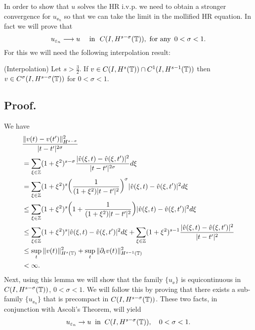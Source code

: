 		In order to show that  $u$ solves the HR i.v.p. we need to 
		obtain a stronger  convergence for  $u_{\ee_n}$ so that 
		we can take the limit in the mollified HR equation.
		In fact we will prove that 
		\begin{equation}
			\label{strong-conv}
			u_{\varepsilon_n}\longrightarrow u
			\quad
			\text{ in } \,\,   C(I, H^{s-\sigma}(\mathbb{T})),\ \text{for any} \
			\, 0 < \sigma <
			1.
		\end{equation}
		For this we will need the following interpolation  result:
		\begin{lemma}
			\label{interpolation-lem}
			(Interpolation)     Let  $s > \frac{3}{2}$.
			If $v \in C(I, H^s(\mathbb{T})) \cap C^1(I, H^{s-1}(\mathbb{T}))$
			then $v \in C^\sigma (I, H^{s- \sigma}(\mathbb{T}))$ for  $0 < \sigma < 1$.
		\end{lemma}
		\subsection{ Proof.}  We have
		\begin{equation*}
			\begin{split}
				& \frac{\|v(t) - v(t')\|^2_{H^{s - \sigma}}}{|t - t'|^{2\sigma}}
				\\
				& = 
				\sum_{\xi \in \mathbb{Z}} (1 + \xi^2)^{s- \sigma} 
				\frac{|\hat{v}(\xi, t) - \hat{v}(\xi, t')|^2}{|t-t'|^{2\sigma}} d\xi\\
				& = \sum_{\xi \in \mathbb{Z}} (1+\xi^2)^s 
				\bigg(\frac{1}{(1+ \xi^2)|t - t'|^2} \bigg)^\sigma |\hat{v}(\xi, t)- \hat{v}(\xi, t')|^2 d\xi\\
				& \leq \sum_{\xi \in \mathbb{Z}}(1+\xi^2)^s \bigg( 1 + \frac{1}{(1+\xi^2)|t-t'|^2} \bigg)
				|\hat{v}(\xi,t) - \hat{v}(\xi,t')|^2 d\xi \\
				& \leq \sum_{\xi \in \mathbb{Z}} (1+ \xi^2)^s |\hat{v}(\xi, t)- \hat{v}(\xi, t')|^2 d\xi
				+ \sum_{\xi \in \mathbb{Z}} (1+ \xi^2)^{s-1} \frac{|\hat{v}(\xi, t) - \hat{v} (\xi, t')|^2}{|t-t'|^2} \\
				& \leq  \sup_t \|v(t)\|_{H^s(\mathbb{T})}^2 + \sup_t
				\| \partial_t v(t) \|_{H^{s-1}(\mathbb{T})}^2
				\\
				& < \infty.
				\\
			\end{split}
		\end{equation*}
		Next, using this lemma we will show that the family $\{u_\ee\}$ is
		equicontinuous in $C(I, H^{s-\sigma}(\mathbb{T}))$, $0 < \sigma < 1$. We
		will follow this by proving that there exists a sub-family
		$\{u_{\ee_n} \}$ that is precompact in $C(I,
		H^{s-\sigma}(\mathbb{T}))$. These two facts, in conjunction with Ascoli's
		Theorem, will yield
		\begin{equation}
			\label{strong-conv2}
			u_{\varepsilon_n} \to u \; \; \text{in} \; \; C(I,H^{s-\sigma}(\mathbb{T})),
			\quad
			0 < \sigma < 1.
		\end{equation}
